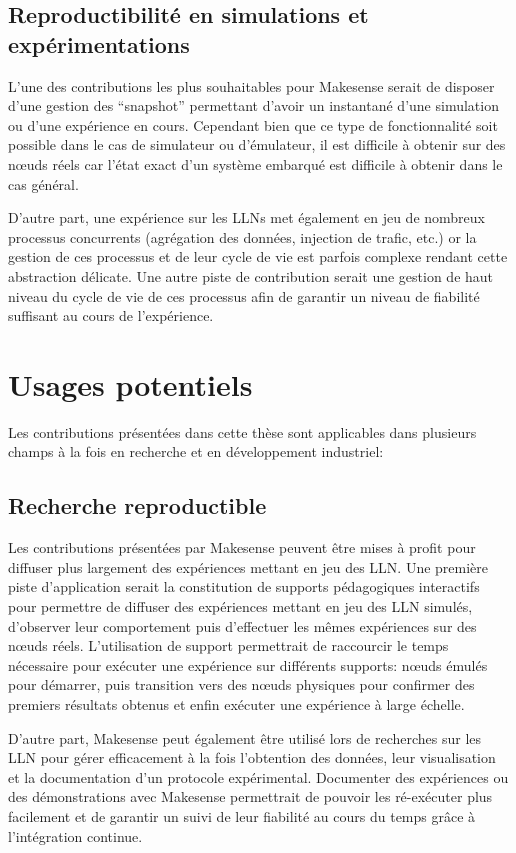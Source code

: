 \subsection{Reproductibilité en simulations et expérimentations}

L'une des contributions les plus souhaitables pour Makesense serait de disposer d'une gestion des ``snapshot'' permettant d'avoir un instantané d'une simulation ou d'une expérience en cours.
Cependant bien que ce type de fonctionnalité soit possible dans le cas de simulateur ou d'émulateur, il est difficile à obtenir sur des nœuds réels car l'état exact d'un système embarqué est difficile à obtenir dans le cas général.

D'autre part, une expérience sur les \ac{LLN}s met également en jeu de nombreux processus concurrents (agrégation des données, injection de trafic, etc.) or la gestion de ces processus et de leur cycle de vie est parfois complexe rendant cette abstraction délicate.
Une autre piste de contribution serait une gestion de haut niveau du cycle de vie de ces processus afin de garantir un niveau de fiabilité suffisant au cours de l'expérience.

\section{Usages potentiels}

Les contributions présentées dans cette thèse sont applicables dans plusieurs champs à la fois en recherche et en développement industriel:

\subsection{Recherche reproductible}

Les contributions présentées par Makesense peuvent être mises à profit pour diffuser plus largement des expériences mettant en jeu des \ac{LLN}.
Une première piste d'application serait la constitution de supports pédagogiques interactifs pour permettre de diffuser des expériences mettant en jeu des \ac{LLN} simulés, d'observer leur comportement puis d'effectuer les mêmes expériences sur des nœuds réels.
L'utilisation de support permettrait de raccourcir le temps nécessaire pour exécuter une expérience sur différents supports: nœuds émulés pour démarrer, puis transition vers des nœuds physiques pour confirmer des premiers résultats obtenus et enfin exécuter une expérience à large échelle.

D'autre part, Makesense peut également être utilisé lors de recherches sur les \ac{LLN} pour gérer efficacement à la fois l'obtention des données, leur visualisation et la documentation d'un protocole expérimental.
Documenter des expériences ou des démonstrations avec Makesense permettrait de pouvoir les ré-exécuter plus facilement et de garantir un suivi de leur fiabilité au cours du temps grâce à l'intégration continue.

